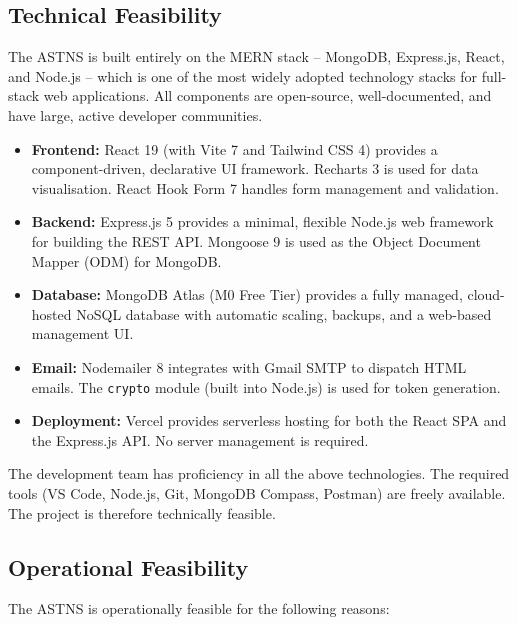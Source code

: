 \documentclass[12pt,a4paper]{report}
\begin{document}
\subsection{Technical Feasibility}
The ASTNS is built entirely on the MERN stack -- MongoDB, Express.js, React, and Node.js -- which is one of the most widely adopted technology stacks for full-stack web applications. All components are open-source, well-documented, and have large, active developer communities.

\begin{itemize}
  \item \textbf{Frontend:} React 19 (with Vite 7 and Tailwind CSS 4) provides a component-driven, declarative UI framework. Recharts 3 is used for data visualisation. React Hook Form 7 handles form management and validation.
  \item \textbf{Backend:} Express.js 5 provides a minimal, flexible Node.js web framework for building the REST API. Mongoose 9 is used as the Object Document Mapper (ODM) for MongoDB.
  \item \textbf{Database:} MongoDB Atlas (M0 Free Tier) provides a fully managed, cloud-hosted NoSQL database with automatic scaling, backups, and a web-based management UI.
  \item \textbf{Email:} Nodemailer 8 integrates with Gmail SMTP to dispatch HTML emails. The \texttt{crypto} module (built into Node.js) is used for token generation.
  \item \textbf{Deployment:} Vercel provides serverless hosting for both the React SPA and the Express.js API. No server management is required.
\end{itemize}

The development team has proficiency in all the above technologies. The required tools (VS Code, Node.js, Git, MongoDB Compass, Postman) are freely available. The project is therefore technically feasible.

\subsection{Operational Feasibility}
The ASTNS is operationally feasible for the following reasons:
\end{document}
